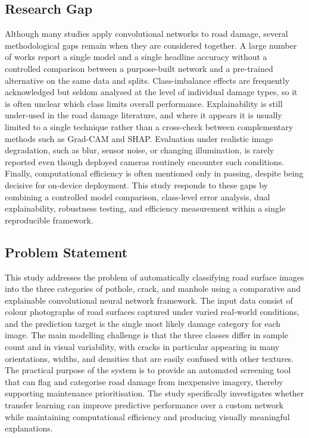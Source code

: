 \documentclass[preprint,12pt]{elsarticle}
\begin{document}
\subsection{Research Gap}

Although many studies apply convolutional networks to road damage, several methodological gaps remain when they are considered together.
A large number of works report a single model and a single headline accuracy without a controlled comparison between a purpose-built network and a pre-trained alternative on the same data and splits.
Class-imbalance effects are frequently acknowledged but seldom analysed at the level of individual damage types, so it is often unclear which class limits overall performance.
Explainability is still under-used in the road damage literature, and where it appears it is usually limited to a single technique rather than a cross-check between complementary methods such as Grad-CAM and SHAP.
Evaluation under realistic image degradation, such as blur, sensor noise, or changing illumination, is rarely reported even though deployed cameras routinely encounter such conditions.
Finally, computational efficiency is often mentioned only in passing, despite being decisive for on-device deployment.
This study responds to these gaps by combining a controlled model comparison, class-level error analysis, dual explainability, robustness testing, and efficiency measurement within a single reproducible framework.

\subsection{Problem Statement}

This study addresses the problem of automatically classifying road surface images into the three categories of pothole, crack, and manhole using a comparative and explainable convolutional neural network framework.
The input data consist of colour photographs of road surfaces captured under varied real-world conditions, and the prediction target is the single most likely damage category for each image.
The main modelling challenge is that the three classes differ in sample count and in visual variability, with cracks in particular appearing in many orientations, widths, and densities that are easily confused with other textures.
The practical purpose of the system is to provide an automated screening tool that can flag and categorise road damage from inexpensive imagery, thereby supporting maintenance prioritisation.
The study specifically investigates whether transfer learning can improve predictive performance over a custom network while maintaining computational efficiency and producing visually meaningful explanations.
\end{document}
